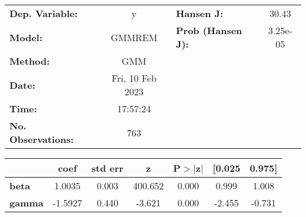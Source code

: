 \begin{center}
\begin{tabular}{lclc}
\toprule
\textbf{Dep. Variable:}    &        y         & \textbf{  Hansen J:          } &     30.43   \\
\textbf{Model:}            &      GMMREM      & \textbf{  Prob (Hansen J):   } &  3.25e-05   \\
\textbf{Method:}           &       GMM        & \textbf{                     } &             \\
\textbf{Date:}             & Fri, 10 Feb 2023 & \textbf{                     } &             \\
\textbf{Time:}             &     17:57:24     & \textbf{                     } &             \\
\textbf{No. Observations:} &         763      & \textbf{                     } &             \\
\bottomrule
\end{tabular}
\begin{tabular}{lcccccc}
               & \textbf{coef} & \textbf{std err} & \textbf{z} & \textbf{P$> |$z$|$} & \textbf{[0.025} & \textbf{0.975]}  \\
\midrule
\textbf{beta}  &       1.0035  &        0.003     &   400.652  &         0.000        &        0.999    &        1.008     \\
\textbf{gamma} &      -1.5927  &        0.440     &    -3.621  &         0.000        &       -2.455    &       -0.731     \\
\bottomrule
\end{tabular}
\end{center}